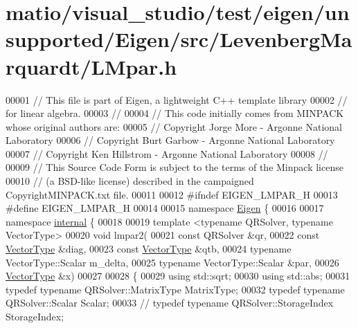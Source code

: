 \hypertarget{matio_2visual__studio_2test_2eigen_2unsupported_2_eigen_2src_2_levenberg_marquardt_2_l_mpar_8h_source}{}\section{matio/visual\+\_\+studio/test/eigen/unsupported/\+Eigen/src/\+Levenberg\+Marquardt/\+L\+Mpar.h}
\label{matio_2visual__studio_2test_2eigen_2unsupported_2_eigen_2src_2_levenberg_marquardt_2_l_mpar_8h_source}

\begin{DoxyCode}
00001 \textcolor{comment}{// This file is part of Eigen, a lightweight C++ template library}
00002 \textcolor{comment}{// for linear algebra.}
00003 \textcolor{comment}{//}
00004 \textcolor{comment}{// This code initially comes from MINPACK whose original authors are:}
00005 \textcolor{comment}{// Copyright Jorge More - Argonne National Laboratory}
00006 \textcolor{comment}{// Copyright Burt Garbow - Argonne National Laboratory}
00007 \textcolor{comment}{// Copyright Ken Hillstrom - Argonne National Laboratory}
00008 \textcolor{comment}{//}
00009 \textcolor{comment}{// This Source Code Form is subject to the terms of the Minpack license}
00010 \textcolor{comment}{// (a BSD-like license) described in the campaigned CopyrightMINPACK.txt file.}
00011 
00012 \textcolor{preprocessor}{#ifndef EIGEN\_LMPAR\_H}
00013 \textcolor{preprocessor}{#define EIGEN\_LMPAR\_H}
00014 
00015 \textcolor{keyword}{namespace }\hyperlink{namespace_eigen}{Eigen} \{
00016 
00017 \textcolor{keyword}{namespace }\hyperlink{namespaceinternal}{internal} \{
00018   
00019   \textcolor{keyword}{template} <\textcolor{keyword}{typename} QRSolver, \textcolor{keyword}{typename} VectorType>
00020     \textcolor{keywordtype}{void} lmpar2(
00021     \textcolor{keyword}{const} QRSolver &qr,
00022     \textcolor{keyword}{const} \hyperlink{struct_vector_type}{VectorType}  &diag,
00023     \textcolor{keyword}{const} \hyperlink{struct_vector_type}{VectorType}  &qtb,
00024     \textcolor{keyword}{typename} VectorType::Scalar m\_delta,
00025     \textcolor{keyword}{typename} VectorType::Scalar &par,
00026     \hyperlink{struct_vector_type}{VectorType}  &x)
00027 
00028   \{
00029     \textcolor{keyword}{using} std::sqrt;
00030     \textcolor{keyword}{using} std::abs;
00031     \textcolor{keyword}{typedef} \textcolor{keyword}{typename} QRSolver::MatrixType MatrixType;
00032     \textcolor{keyword}{typedef} \textcolor{keyword}{typename} QRSolver::Scalar Scalar;
00033 \textcolor{comment}{//    typedef typename QRSolver::StorageIndex StorageIndex;}

\end{DoxyCode}
